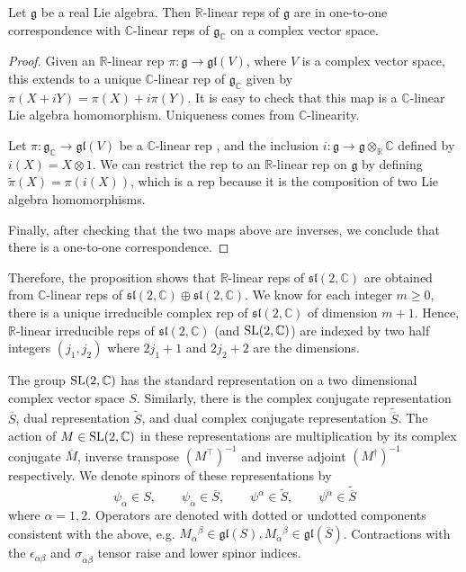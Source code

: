\begin{prop}
	Let $\mathfrak{g}$ be a real Lie algebra. Then
	$\mathbb{R}$-linear reps of $\mathfrak{g}$ are in one-to-one
	correspondence with $\mathbb{C}$-linear reps of  $\mathfrak{g}_{\mathbb{C}}$
	on a complex vector space. 
\end{prop}
\begin{proof}
	Given an $\mathbb{R}$-linear rep $\pi : \mathfrak{g} \to \mathfrak{gl}(V)$,
	where  $V$ is a complex vector space, this extends to a unique
	$\mathbb{C}$-linear rep of $\mathfrak{g}_{\mathbb{C}}$ given by 
	$\pi(X+iY) = \pi(X) + i\pi(Y)$. It is easy to check that this map is  a
	$\mathbb{C}$-linear Lie algebra homomorphism. Uniqueness comes from
	$\mathbb{C}$-linearity.

	Let $\pi : \mathfrak{g}_{\mathbb{C}} \to\mathfrak{gl}(V)$ be a 
	$\mathbb{C}$-linear rep , and the inclusion $i : \mathfrak{g} \to
	\mathfrak{g}\otimes_{\mathbb{R}}\mathbb{C}$ defined by $i(X) = X\otimes 1$. We can restrict
	the rep to an $\mathbb{R}$-linear rep on $\mathfrak{g}$ by defining
	$\widetilde{\pi}(X) = \pi(i(X))$, which is a rep because it is the composition of
	two Lie algebra homomorphisms. 

	Finally, after checking that the two maps above are inverses, we conclude
	that there is a one-to-one correspondence. 
\end{proof}

Therefore, the proposition shows that $\mathbb{R}$-linear reps of
$\mathfrak{sl}(2,\mathbb{C})$ are obtained from $\mathbb{C}$-linear reps of
$\mathfrak{sl}(2,\mathbb{C})\oplus \mathfrak{sl}(2,\mathbb{C})$.
We know for each integer $m\geq 0$, there is a unique irreducible complex
rep of $\mathfrak{sl}(2,\mathbb{C})$ of dimension $m+1$.\cite{hall} Hence,
$\mathbb{R}$-linear irreducible reps  of $\mathfrak{sl}(2,\mathbb{C})$ (and
$\operatorname{SL}(2,\mathbb{C})$)
are indexed by two half integers $(j_1,j_2)$ where $2j_1+1$ and $2j_2+2$ are the
dimensions.  

The group $\operatorname{SL}(2,\mathbb{C})$ has the standard representation on a two dimensional
complex vector space $S$. Similarly, there is the complex conjugate
representation $\overline{S}$, dual representation $\widetilde{S}$, and dual
complex conjugate representation $\widetilde{\overline{S}}$. 
The action of $M\in \operatorname{SL}(2,\mathbb{C})$ in these representations are
multiplication by its complex conjugate $\overline{M}$, inverse transpose
$(M^\intercal)^{-1}$ and inverse adjoint $(M^{\dagger})^{-1}$ respectively.
We denote spinors of these representations by 
\[
\psi_\alpha \in S, \qquad \psi_{\dot{\alpha}}\in \overline{S}, \qquad
\psi^\alpha \in \widetilde{S}, \qquad \psi^{\dot{\alpha}}\in \widetilde{\overline{S}}
\] 
where $\alpha=1,2$.
Operators are denoted with dotted or undotted components consistent with the
above, e.g. $M_{\alpha}{}^\beta \in \mathfrak{gl}(S),
M_{\dot{\alpha}}{}^{\dot{\beta}} \in \mathfrak{gl}(\overline{S})$. 
Contractions with the $\epsilon_{\alpha\beta}$ and 
$\sigma_{\dot{\alpha}\dot{\beta}}$ tensor raise and lower spinor indices.

